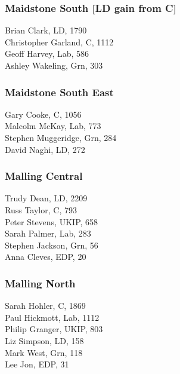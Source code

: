 \documentclass[a4paper,openany,10pt]{book}
\begin{document}
\subsubsection*{Maidstone South \hspace*{\fill}\nolinebreak[1]%
\enspace\hspace*{\fill}
[LD gain from C]}



Brian Clark, LD, 1790\\
Christopher Garland, C, 1112\\
Geoff Harvey, Lab, 586\\
Ashley Wakeling, Grn, 303\\


\subsubsection*{Maidstone South East}



Gary Cooke, C, 1056\\
Malcolm McKay, Lab, 773\\
Stephen Muggeridge, Grn, 284\\
David Naghi, LD, 272\\


\subsubsection*{Malling Central}



Trudy Dean, LD, 2209\\
Russ Taylor, C, 793\\
Peter Stevens, UKIP, 658\\
Sarah Palmer, Lab, 283\\
Stephen Jackson, Grn, 56\\
Anna Cleves, EDP, 20\\


\subsubsection*{Malling North}



Sarah Hohler, C, 1869\\
Paul Hickmott, Lab, 1112\\
Philip Granger, UKIP, 803\\
Liz Simpson, LD, 158\\
Mark West, Grn, 118\\
Lee Jon, EDP, 31\\
\end{document}
